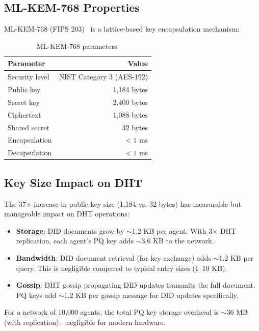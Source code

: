 \documentclass[11pt,twocolumn]{article}
\begin{document}
\subsection{ML-KEM-768 Properties}

ML-KEM-768 (FIPS 203)~\cite{nist2024pqc} is a lattice-based key encapsulation
mechanism:

\begin{table}[h]
\centering
\begin{tabular}{lr}
\toprule
\textbf{Parameter} & \textbf{Value} \\
\midrule
Security level & NIST Category 3 (AES-192) \\
Public key & 1,184 bytes \\
Secret key & 2,400 bytes \\
Ciphertext & 1,088 bytes \\
Shared secret & 32 bytes \\
Encapsulation & $<1$ ms \\
Decapsulation & $<1$ ms \\
\bottomrule
\end{tabular}
\caption{ML-KEM-768 parameters.}
\end{table}

\subsection{Key Size Impact on DHT}

The 37$\times$ increase in public key size (1,184 vs. 32 bytes) has
measurable but manageable impact on DHT operations:

\begin{itemize}[nosep]
  \item \textbf{Storage}: DID documents grow by $\sim$1.2 KB per agent.
    With 3$\times$ DHT replication, each agent's PQ key adds $\sim$3.6 KB
    to the network.
  \item \textbf{Bandwidth}: DID document retrieval (for key exchange) adds
    $\sim$1.2 KB per query. This is negligible compared to typical entry
    sizes (1--10 KB).
  \item \textbf{Gossip}: DHT gossip propagating DID updates transmits the
    full document. PQ keys add $\sim$1.2 KB per gossip message for DID
    updates specifically.
\end{itemize}

For a network of 10,000 agents, the total PQ key storage overhead is
$\sim$36 MB (with replication)---negligible for modern hardware.
\end{document}
